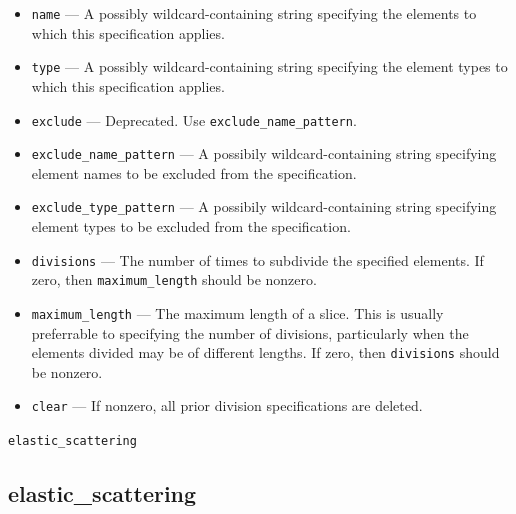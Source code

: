 \documentclass[11pt]{article}
\begin{document}
\begin{itemize}
\item \verb|name| --- A possibly wildcard-containing string specifying
	the elements to which this specification applies.
\item \verb|type| --- A possibly wildcard-containing string specifying
 	the element types to which this specification applies.
\item \verb|exclude| --- Deprecated. Use \verb|exclude_name_pattern|.
\item \verb|exclude_name_pattern| --- A possibily wildcard-containing string specifying
 	element names to be excluded from the specification.
\item \verb|exclude_type_pattern| --- A possibily wildcard-containing string specifying
 	element types to be excluded from the specification.
\item \verb|divisions| --- The number of times to subdivide the specified
	elements.  If zero, then \verb|maximum_length| should be nonzero.
\item \verb|maximum_length| --- The maximum length of a slice.  This is
	usually preferrable to specifying the number of divisions, particularly
	when the elements divided may be of different lengths.  If zero, then
	\verb|divisions| should be nonzero.
\item \verb|clear| --- If nonzero, all prior division specifications are
	deleted.
\end{itemize}

\newpage
\begin{center}{\Large\verb|elastic_scattering|}\end{center}
\subsection{elastic\_scattering \label{subsec:elasticscattering}}
\end{document}

